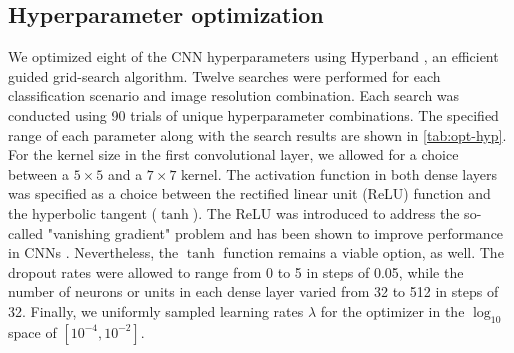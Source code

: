 \documentclass[Journal,letterpaper, SingleSpace, InsideFigs]{ascelike-new}
\begin{document}
\subsection{Hyperparameter optimization}
We optimized eight of the CNN hyperparameters using Hyperband \cite{li2018hyperband}, an efficient guided grid-search algorithm.
Twelve searches were performed for each classification scenario and image resolution combination.
Each search was conducted using 90 trials of unique hyperparameter combinations. The specified range of each parameter along with the search results are shown in \autoref{tab:opt-hyp}. For the kernel size in the first convolutional layer, we allowed for a choice between a $5\times 5$ and a $7\times 7$ kernel. The activation function in both dense layers was specified as a choice between the rectified linear unit (ReLU) function and the hyperbolic tangent ($\tanh$). The ReLU was introduced to address the so-called "vanishing gradient" problem and has been shown to improve performance in CNNs \cite{glorot2011deep}. Nevertheless, the $\tanh$ function remains a viable option, as well. The dropout rates were allowed to range from 0 to 5 in steps of 0.05, while the number of neurons or units in each dense layer varied from 32 to 512 in steps of 32. Finally, we uniformly sampled learning rates $\lambda$ for the optimizer in the $\log_{10}$ space of $[10^{-4}, 10^{-2}]$.
\end{document}
